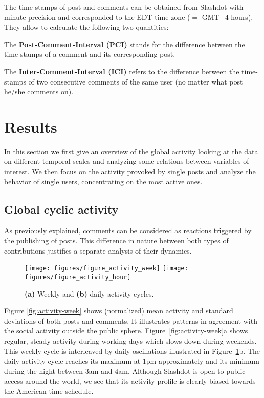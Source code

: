 \documentclass[twoside,11pt]{article}
\begin{document}
The time-stamps of post and comments can be obtained from Slashdot
with minute-precision and corresponded to the EDT time zone ($=$
GMT$-4$ hours).  They allow to calculate the following two quantities:

The \textbf{Post-Comment-Interval (PCI)} stands for the difference
between the time-stamps of a comment and its corresponding post.

The \textbf{Inter-Comment-Interval (ICI)} refers to the difference
between the time-stamps of two consecutive comments of the same user
(no matter what post he/she comments on).


\section{Results}
\label{sec:results}
\noindent
In this section we first give an overview of the global activity
looking at the data on different temporal scales and analyzing some
relations between variables of interest.  We then focus on the
activity provoked by single posts and analyze the behavior of single
users, concentrating on the most active ones.

\subsection{Global cyclic activity}
\label{sec:global}
\noindent
As previously explained, comments can be considered as reactions
triggered by the publishing of posts. This difference in nature
between both types of contributions justifies a separate analysis of
their dynamics.

\begin{figure}[!tb]\centering
\texttt{[image: figures/figure\_activity\_week]}
\texttt{[image: figures/figure\_activity\_hour]}
\caption{\textbf{(a)} Weekly and \textbf{(b)} daily activity cycles.}
\label{fig:activity-week}
\label{fig:activity-hour}
\end{figure}

Figure \ref{fig:activity-week} shows (normalized) mean activity and
standard deviations of both posts and comments.  It illustrates
patterns in agreement with the social activity outside the public
sphere.  Figure~\ref{fig:activity-week}a shows regular, steady
activity during working days which slows down during weekends.  This
weekly cycle is interleaved by daily oscillations illustrated in
Figure~\ref{fig:activity-hour}b.  The daily activity cycle reaches its
maximum at $1$pm approximately and its minimum during the night
between $3$am and $4$am.  Although Slashdot is open to public access
around the world, we see that its activity profile is clearly biased
towards the American time-schedule.
\end{document}
